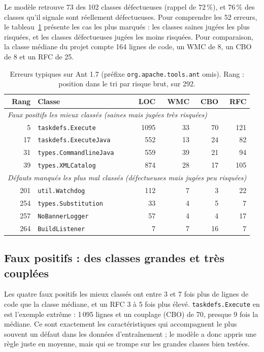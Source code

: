 \documentclass[11pt,a4paper,openany]{report}
\newcommand{\code}[1]{\texttt{\small #1}}
\begin{document}
Le modèle retrouve 73 des 102 classes défectueuses (rappel de 72\,\%), et 76\,\% des classes qu'il signale sont
réellement défectueuses. Pour comprendre les 52 erreurs, le tableau~\ref{tab:errors} présente les cas les plus
marqués : les classes saines jugées les plus risquées, et les classes défectueuses jugées les moins risquées.
Pour comparaison, la classe médiane du projet compte 164 lignes de code, un WMC de 8, un CBO de 8 et un RFC de 25.

\begin{table}[H]
\centering\small
\caption{Erreurs typiques sur Ant 1.7 (préfixe \code{org.apache.tools.ant} omis). Rang : position dans le tri par
risque brut, sur 292.}
\label{tab:errors}
\begin{tabular}{rlrrrr}
\toprule
\textbf{Rang} & \textbf{Classe} & \textbf{LOC} & \textbf{WMC} & \textbf{CBO} & \textbf{RFC} \\
\midrule
\multicolumn{6}{l}{\textit{Faux positifs les mieux classés (saines mais jugées très risquées)}} \\
5  & \code{taskdefs.Execute}         & 1095 & 33 & 70 & 121 \\
17 & \code{taskdefs.ExecuteJava}     & 552  & 13 & 24 & 82 \\
31 & \code{types.CommandlineJava}    & 559  & 39 & 21 & 94 \\
39 & \code{types.XMLCatalog}         & 874  & 28 & 17 & 105 \\
\midrule
\multicolumn{6}{l}{\textit{Défauts manqués les plus mal classés (défectueuses mais jugées peu risquées)}} \\
201 & \code{util.Watchdog}            & 112 & 7 & 3  & 22 \\
254 & \code{types.Substitution}       & 33  & 4 & 5  & 7 \\
257 & \code{NoBannerLogger}           & 57  & 4 & 4  & 17 \\
264 & \code{BuildListener}            & 7   & 7 & 16 & 7 \\
\bottomrule
\end{tabular}
\end{table}

\subsection{Faux positifs : des classes grandes et très couplées}
Les quatre faux positifs les mieux classés ont entre 3 et 7 fois plus de lignes de code que la classe médiane, et
un RFC 3 à 5 fois plus élevé. \code{taskdefs.Execute} en est l'exemple extrême : 1\,095 lignes et un couplage
(CBO) de 70, presque 9 fois la médiane. Ce sont exactement les caractéristiques qui accompagnent le plus souvent un
défaut dans les données d'entraînement ; le modèle a donc appris une règle juste en moyenne, mais qui se trompe sur
les grandes classes bien testées.
\end{document}
